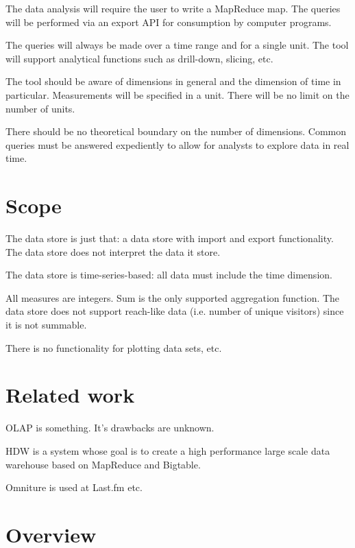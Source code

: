 The data analysis will require the user to write a MapReduce map. The queries
will be performed via an export API for consumption by computer programs.

The queries will always be made over a time range and for a single unit. The
tool will support analytical functions such as drill-down, slicing, etc.

The tool should be aware of dimensions in general and the dimension of time in
particular. Measurements will be specified in a unit. There will be no limit
on the number of units.

There should be no theoretical boundary on the number of dimensions. Common
queries must be answered expediently to allow for analysts to explore data in
real time.



\section{Scope}


The data store is just that: a data store with import and export
functionality. The data store does not interpret the data it store.

The data store is time-series-based: all data must include the time dimension.

All measures are integers. Sum is the only supported aggregation function. The
data store does not support reach-like data (i.e. number of unique visitors)
since it is not summable.

There is no functionality for plotting data sets, etc.



\section{Related work}


OLAP is something. It's drawbacks are unknown.

HDW is a system whose goal is to create a high performance large scale data
warehouse based on MapReduce and Bigtable. \cite{hdw}

Omniture is used at Last.fm etc.


\section{Overview}

